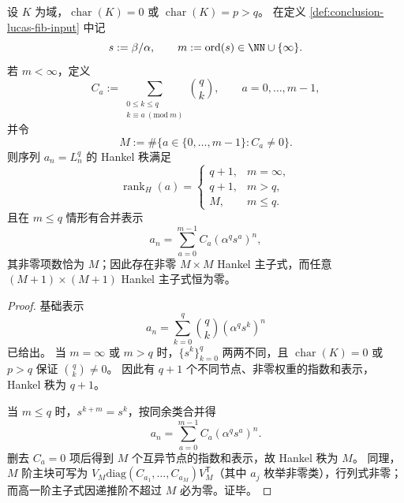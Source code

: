 \begin{theorem}\label{thm:conclusion-charp-hankel-rank-classification}
设 \(K\) 为域，\(\operatorname{char}(K)=0\) 或 \(\operatorname{char}(K)=p>q\)。
在定义 \ref{def:conclusion-lucas-fib-input} 中记
\[
s:=\beta/\alpha,\qquad m:=\operatorname{ord}(s)\in\NN\cup\{\infty\}.
\]
若 \(m<\infty\)，定义
\[
C_a:=\sum_{\substack{0\le k\le q\\ k\equiv a\ (\mathrm{mod}\ m)}}\binom{q}{k},
\qquad
a=0,\dots,m-1,
\]
并令
\[
M:=\#\{a\in\{0,\dots,m-1\}:C_a\neq 0\}.
\]
则序列 \(a_n=L_n^q\) 的 Hankel 秩满足
\[
\operatorname{rank}_H(a)=
\begin{cases}
q+1,& m=\infty,\\
q+1,& m>q,\\
M,& m\le q.
\end{cases}
\]
且在 \(m\le q\) 情形有合并表示
\[
a_n=\sum_{a=0}^{m-1}C_a(\alpha^q s^a)^n,
\]
其非零项数恰为 \(M\)；因此存在非零 \(M\times M\) Hankel 主子式，而任意 \((M+1)\times(M+1)\) Hankel 主子式恒为零。
\end{theorem}
\begin{proof}
基础表示
\[
a_n=\sum_{k=0}^{q}\binom{q}{k}(\alpha^q s^k)^n
\]
已给出。
当 \(m=\infty\) 或 \(m>q\) 时，\(\{s^k\}_{k=0}^{q}\) 两两不同，且 \(\operatorname{char}(K)=0\) 或 \(p>q\) 保证 \(\binom{q}{k}\neq 0\)。
因此有 \(q+1\) 个不同节点、非零权重的指数和表示，Hankel 秩为 \(q+1\)。

当 \(m\le q\) 时，\(s^{k+m}=s^k\)，按同余类合并得
\[
a_n=\sum_{a=0}^{m-1}C_a(\alpha^q s^a)^n.
\]
删去 \(C_a=0\) 项后得到 \(M\) 个互异节点的指数和表示，故 Hankel 秩为 \(M\)。
同理，\(M\) 阶主块可写为 \(V_M\mathrm{diag}(C_{a_1},\dots,C_{a_M})V_M^{\mathsf T}\)（其中 \(a_j\) 枚举非零类），行列式非零；而高一阶主子式因递推阶不超过 \(M\) 必为零。证毕。
\end{proof}

